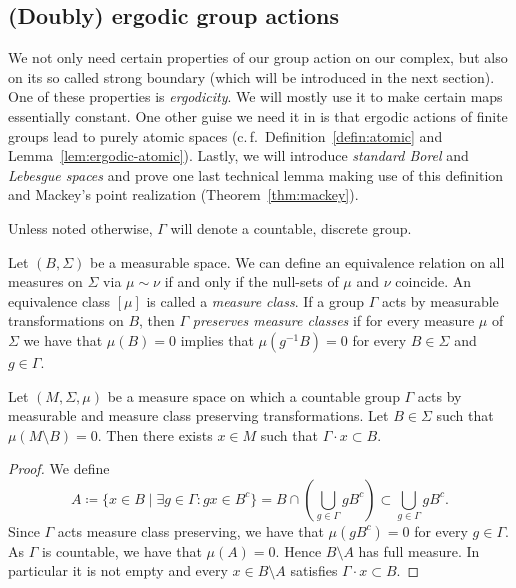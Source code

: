 \subsection{(Doubly) ergodic group actions}
\label{sec:ergodic}

We not only need certain properties of our group action on our complex, but also on its so called strong boundary (which will be introduced in the next section). One of these properties is \emph{ergodicity}. We will mostly use it to make certain maps essentially constant. One other guise we need it in is that ergodic actions of finite groups lead to purely atomic spaces (c.\,f.\ Definition~\ref{defin:atomic} and Lemma~\ref{lem:ergodic-atomic}). Lastly, we will introduce \emph{standard Borel} and \emph{Lebesgue spaces} and prove one last technical lemma making use of this definition and Mackey's point realization (Theorem~\ref{thm:mackey}).

Unless noted otherwise, \(\Gamma\) will denote a countable, discrete group.

\begin{defin}
  Let \((B, \Sigma)\) be a measurable space. We can define an equivalence relation on all measures on \(\Sigma\) via \(\mu \sim \nu\) if and only if the null-sets of \(\mu\) and \(\nu\) coincide. An equivalence class \([\mu]\) is called a \emph{measure class}. If a group \(\Gamma\) acts by measurable transformations on \(B\), then \(\Gamma\) \emph{preserves measure classes} if for every measure \(\mu\) of \(\Sigma\) we have that \(\mu(B) = 0\) implies that \(\mu(g^{-1} B) = 0\) for every \(B \in \Sigma\) and \(g \in \Gamma\).
\end{defin}

\begin{lemma}
  \label{lem:countable-orbit}
  Let \((M, \Sigma, \mu)\) be a measure space on which a countable group \(\Gamma\) acts by measurable and measure class preserving transformations. Let \(B \in \Sigma\) such that \(\mu(M \setminus B) = 0\). Then there exists \(x \in M\) such that \(\Gamma \cdot x \subset B\).
\end{lemma}

\begin{proof}
  We define
  \[
    A \coloneqq \{x \in B \mid \exists g \in \Gamma\colon gx \in B^c\} = B \cap \left( \bigcup_{g \in \Gamma} gB^c\right) \subset \bigcup_{g \in \Gamma} gB^c.
  \]
  Since \(\Gamma\) acts measure class preserving, we have that \(\mu(gB^c) = 0\) for every \(g \in \Gamma\). As \(\Gamma\) is countable, we have that \(\mu(A) = 0\). Hence \(B \setminus A\) has full measure. In particular it is not empty and every \(x \in B \setminus A\) satisfies \(\Gamma \cdot x \subset B\).
\end{proof}


